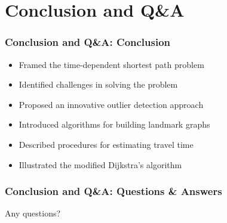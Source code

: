 \documentclass{beamer}
\theoremstyle{definition}
\begin{document}
\section{Conclusion and Q\&A}
\begin{frame}
\frametitle{Conclusion and Q\&A: Conclusion}
\begin{itemize}
	\item <1-> Framed the time-dependent shortest path problem
	\item <2-> Identified challenges in solving the problem
	\item <3-> Proposed an innovative outlier detection approach
	\item <4-> Introduced algorithms for building landmark graphs
	\item <5-> Described procedures for estimating travel time
	\item <6-> Illustrated the modified Dijkstra's algorithm
\end{itemize}
\end{frame}

\begin{frame}
\frametitle{Conclusion and Q\&A: Questions \& Answers}
\begin{center}
\huge Any questions?
\end{center}
\end{frame}
\end{document}

